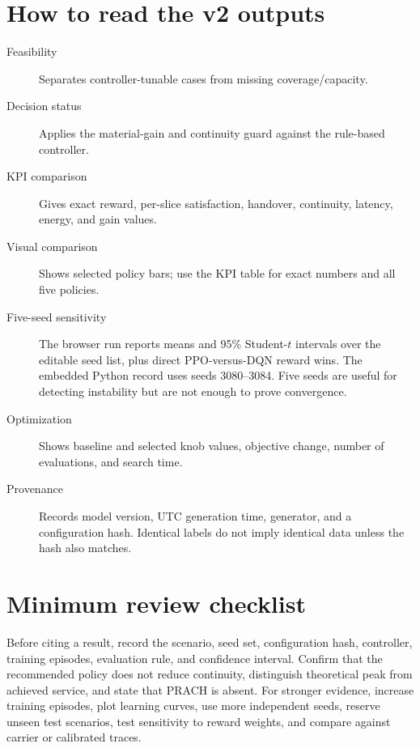 \documentclass[10pt]{article}
\begin{document}
\section{How to read the v2 outputs}
\begin{description}
  \item[Feasibility] Separates controller-tunable cases from missing coverage/capacity.
  \item[Decision status] Applies the material-gain and continuity guard against the rule-based controller.
  \item[KPI comparison] Gives exact reward, per-slice satisfaction, handover, continuity, latency, energy, and gain values.
  \item[Visual comparison] Shows selected policy bars; use the KPI table for exact numbers and all five policies.
  \item[Five-seed sensitivity] The browser run reports means and 95\% Student-$t$ intervals over the editable seed list, plus direct PPO-versus-DQN reward wins. The embedded Python record uses seeds 3080--3084. Five seeds are useful for detecting instability but are not enough to prove convergence.
  \item[Optimization] Shows baseline and selected knob values, objective change, number of evaluations, and search time.
  \item[Provenance] Records model version, UTC generation time, generator, and a configuration hash. Identical labels do not imply identical data unless the hash also matches.
\end{description}

\section{Minimum review checklist}
Before citing a result, record the scenario, seed set, configuration hash, controller, training episodes, evaluation rule, and confidence interval. Confirm that the recommended policy does not reduce continuity, distinguish theoretical peak from achieved service, and state that PRACH is absent. For stronger evidence, increase training episodes, plot learning curves, use more independent seeds, reserve unseen test scenarios, test sensitivity to reward weights, and compare against carrier or calibrated traces.
\end{document}
